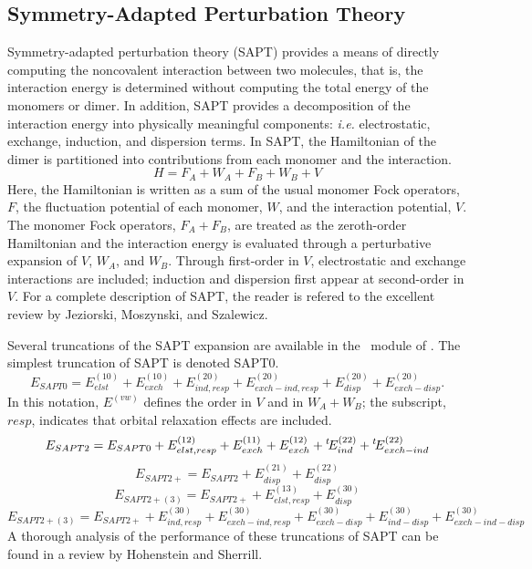 \subsection{Symmetry-Adapted Perturbation Theory} \label{sapt}

Symmetry-adapted perturbation theory (SAPT) provides a means of directly
computing the noncovalent interaction between two molecules, that is, the
interaction energy is determined without computing the total energy of the
monomers or dimer. In addition, SAPT provides a decomposition of the
interaction energy into physically meaningful components: {\em i.e.}
electrostatic, exchange, induction, and dispersion terms. In SAPT, the 
Hamiltonian of the dimer is partitioned into contributions from each 
monomer and the interaction.
\begin{equation}
H=F_A+W_A+F_B+W_B+V
\end{equation}
Here, the Hamiltonian is written as a sum of the usual monomer Fock
operators, $F$, the fluctuation potential of each monomer, $W$, and the
interaction potential, $V$. The monomer Fock operators, $F_A+F_B$, are
treated as the zeroth-order Hamiltonian and the interaction energy is
evaluated through a perturbative expansion of $V$, $W_A$, and $W_B$. 
Through first-order in $V$, electrostatic and exchange interactions are
included; induction and dispersion first appear at second-order in $V$. For
a complete description of SAPT, the reader is refered to the excellent
review by Jeziorski, Moszynski, and Szalewicz.\cite{Jeziorski:1994:1887}

Several truncations of the SAPT expansion are available in the \PSIsapt\
module of \PSIfour. The simplest truncation of SAPT is denoted SAPT0.
\begin{equation}
\label{eqn:SAPT0}
E_{SAPT0} = E_{elst}^{(10)} + E_{exch}^{(10)} + E_{ind,resp}^{(20)} +
E_{exch-ind,resp}^{(20)} + E_{disp}^{(20)} + E_{exch-disp}^{(20)}.
\end{equation}
In this notation, $E^{(vw)}$ defines the order in $V$ and in $W_A+W_B$; the
subscript, $resp$, indicates that orbital relaxation effects are included.
\begin{equation}
\label{eqn:SAPT2}
E_{SAPT2} = E_{SAPT0} + E_{elst,resp}^{(12)} + E_{exch}^{(11)} +
E_{exch}^{(12)} +\/ ^{t}\!E_{ind}^{(22)} +\/ ^{t}\!E_{exch-ind}^{(22)}
\end{equation}
\begin{equation}
\label{eqn:SAPT2+}
E_{SAPT2+} = E_{SAPT2} + E_{disp}^{(21)} + E_{disp}^{(22)}
\end{equation}
\begin{equation}
\label{eqn:SAPT2+p3}
E_{SAPT2+(3)} = E_{SAPT2+} + E_{elst,resp}^{(13)} + E_{disp}^{(30)}
\end{equation}
\begin{equation}
\label{eqn:SAPT2+3}
E_{SAPT2+(3)} = E_{SAPT2+} + E_{ind,resp}^{(30)} + E_{exch-ind,resp}^{(30)}
+ E_{exch-disp}^{(30)} + E_{ind-disp}^{(30)} + E_{exch-ind-disp}^{(30)}
\end{equation}
A thorough analysis of the performance of these truncations of SAPT can be
found in a review by Hohenstein and Sherrill.\cite{Hohenstein:2012:WIREs}

